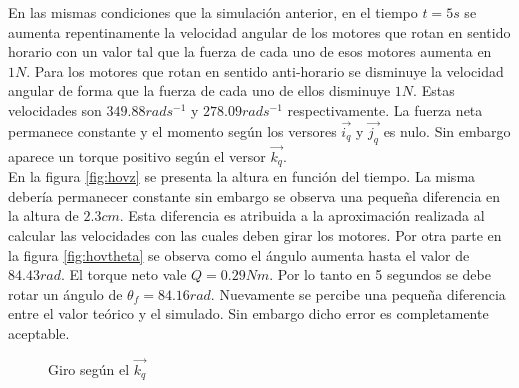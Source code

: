 \documentclass[main]{subfiles}
\begin{document}
En las mismas condiciones que la simulaci\'on anterior, en el tiempo $t=5s$ se aumenta repentinamente la velocidad angular de los motores que rotan en sentido horario con un valor tal que la fuerza de cada uno de esos motores aumenta en $1N$. Para los motores que rotan en sentido anti-horario se disminuye la velocidad angular de forma que la fuerza de cada uno de ellos disminuye $1N$. Estas velocidades son $349.88rads^{-1}$ y $278.09rads^{-1}$ respectivamente. La fuerza neta permanece constante y el momento seg\'un los versores $\vec{i_q}$ y $\vec{j_q} $ es nulo. Sin embargo aparece un torque positivo seg\'un el versor $\vec{k_q}$.\\

En la figura \ref{fig:hovz} se presenta la altura en funci\'on del tiempo. La misma deber\'ia permanecer constante sin embargo se observa una peque\~na diferencia en la altura de $2.3cm$. Esta diferencia es atribuida a la aproximaci\'on realizada al calcular las velocidades con las cuales deben girar los motores. Por otra parte en la figura \ref{fig:hovtheta} se observa como el \'angulo aumenta hasta el valor de $84.43 rad$. El torque neto vale $Q = 0.29Nm $. Por lo tanto en 5 segundos se debe rotar un \'angulo de $\theta_f=84.16rad$. Nuevamente se percibe una peque\~na diferencia entre el valor te\'orico y el simulado. Sin embargo dicho error es completamente aceptable. 



\begin{figure} [h!]
  \centering
  \caption{Giro seg\'un el $\vec{k_q}$}
  \label{fig:hov}
\end{figure}
\end{document}
